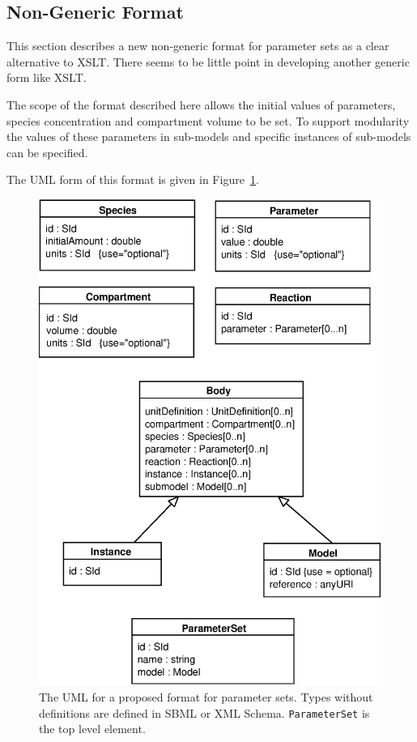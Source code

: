 \documentclass[10pt,twocolumntoc]{cekarticle}
\begin{document}
\subsection{Non-Generic Format}

This section describes a new non-generic format for parameter sets as a clear alternative
to XSLT.
There seems to be little point in developing another generic form like XSLT.

The scope of the format described here allows the initial values of parameters, species
concentration and compartment volume to be set.  To support modularity the values of these
parameters in sub-models and specific instances of sub-models can be specified.

The UML form of this format is given in Figure~\ref{fig:uml}.

\begin{figure}[h]
  \vspace*{8pt}
  \centering
  \includegraphics[scale = 0.7]{uml}
  \caption{The UML for a proposed format for parameter sets.  Types without definitions are
  defined in SBML or XML Schema.  \texttt{ParameterSet} is the top level element.}
  \label{fig:uml}
\end{figure}
\end{document}
